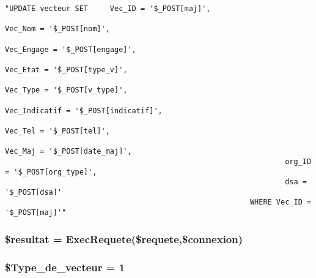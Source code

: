 \footnotesize\begin{verbatim}"UPDATE vecteur SET     Vec_ID = '$_POST[maj]',
                                                                Vec_Nom = '$_POST[nom]',
                                                                Vec_Engage = '$_POST[engage]',
                                                                Vec_Etat = '$_POST[type_v]',
                                                                Vec_Type = '$_POST[v_type]',
                                                                Vec_Indicatif = '$_POST[indicatif]',
                                                                Vec_Tel = '$_POST[tel]',
                                                                Vec_Maj = '$_POST[date_maj]',
                                                                org_ID = '$_POST[org_type]',
                                                                dsa = '$_POST[dsa]'
                                                        WHERE Vec_ID = '$_POST[maj]'"
\end{verbatim}\normalsize 
\hypertarget{vecteur__enregistre_8php_a3}{
\subsubsection[\$resultat]{\setlength{\rightskip}{0pt plus 5cm}\$resultat = Exec\-Requete(\$requete,\$connexion)}}
\label{vecteur__enregistre_8php_a3}


\hypertarget{vecteur__enregistre_8php_a1}{
\subsubsection[\$Type\_\-de\_\-vecteur]{\setlength{\rightskip}{0pt plus 5cm}\$Type\_\-de\_\-vecteur = 1}}
\label{vecteur__enregistre_8php_a1}



